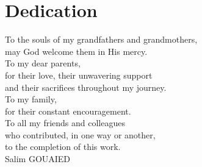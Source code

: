 \section*{Dedication}

\vspace*{2.5cm}

\begin{flushright}
\begin{minipage}{0.72\textwidth}
\raggedleft\itshape

To the souls of my grandfathers and grandmothers,\\
may God welcome them in His mercy.\\[1cm]

To my dear parents,\\
for their love, their unwavering support\\
and their sacrifices throughout my journey.\\[1cm]

To my family,\\
for their constant encouragement.\\[1cm]

To all my friends and colleagues\\
who contributed, in one way or another,\\
to the completion of this work.\\[1cm]

\upshape\normalsize Salim GOUAIED

\end{minipage}
\end{flushright}

\vfill
